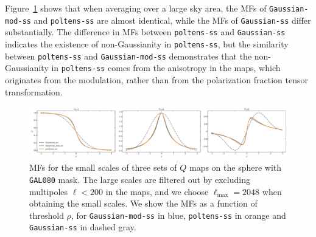 \documentclass[twocolumn]{aastex631}
\begin{document}
Figure~\ref{fig:MF:sphere} shows that when averaging over a large sky area, the MFs of \texttt{Gaussian-mod-ss} and \texttt{poltens-ss} are almost identical, while the MFs of \texttt{Gaussian-ss} differ substantially. The difference in MFs between \texttt{poltens-ss} and \texttt{Gaussian-ss} indicates the existence of non-Gaussianity in \texttt{poltens-ss}, but the similarity between \texttt{poltens-ss} and \texttt{Gaussian-mod-ss} demonstrates that the non-Gaussianity in \texttt{poltens-ss} comes from the anisotropy in the maps, which originates from the modulation, rather than from the polarization fraction tensor transformation.

\begin{figure}
    \centering
    \includegraphics[width=180mm]{figures/MFs_80p_sky_Q.pdf}
    \caption{MFs for the small scales of three sets of $Q$ maps on the sphere with \texttt{GAL080} mask. The large scales are filtered out by excluding multipoles $\ell < 200$ in the maps, and we choose $\ell_\text{max} = 2048$ when obtaining the small scales. We show the MFs as a function of threshold $\rho$, for \texttt{Gaussian-mod-ss} in blue, \texttt{poltens-ss} in orange and \texttt{Gaussian-ss} in dashed gray.}
    \label{fig:MF:sphere}
\end{figure}
\end{document}
